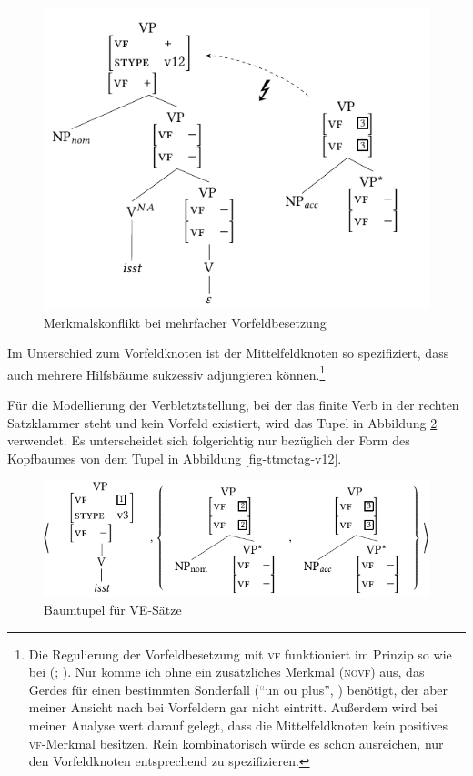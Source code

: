 \begin{figure}[t]
\centering
\includegraphics{graphics/abb77.pdf}
\caption{\label{fig-ttmctag-vorfeld2}Merkmalskonflikt bei mehrfacher Vorfeldbesetzung}
\end{figure} 
Im Unterschied zum Vorfeldknoten ist der Mittelfeldknoten so spezifiziert, dass auch mehrere Hilfsbäume sukzessiv adjungieren können.\footnote{Die Regulierung der Vorfeldbesetzung mit \textsc{vf} funktioniert im Prinzip so wie bei \citeauthor{Gerdes:02b} (\citeyear{Gerdes:02}; \citeyear[Abschnitt~4.3.2]{Gerdes:02b}). Nur komme ich ohne ein zusätzliches Merkmal (\textsc{novf}) aus, das Gerdes für einen bestimmten Sonderfall ("`un ou plus"', \citealt[Abbildung~126, 178]{Gerdes:02b}) benötigt, der aber meiner Ansicht nach bei Vorfeldern gar nicht eintritt. Außerdem wird bei meiner Analyse wert darauf gelegt, dass die Mittelfeldknoten kein positives \textsc{vf}-Merkmal besitzen. Rein kombinatorisch würde es schon ausreichen, nur den Vorfeldknoten entsprechend zu spezifizieren.}  

Für die Modellierung der Verbletztstellung, bei der das finite Verb in der rechten Satzklammer steht und kein Vorfeld existiert, wird das Tupel in Abbildung \ref{fig-ttmctag-v3} verwendet. Es unterscheidet sich folgerichtig nur bezüglich der Form des Kopfbaumes von dem Tupel in Abbildung \ref{fig-ttmctag-v12}.   

\begin{figure}[p]
\centering
\includegraphics{graphics/abb78.pdf}
\caption{\label{fig-ttmctag-v3}Baumtupel für VE-Sätze}
\end{figure} 

